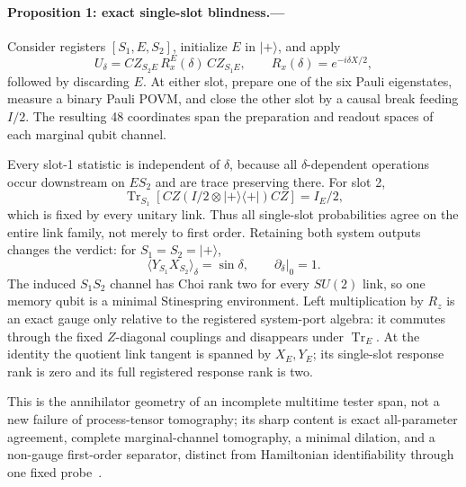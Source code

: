 \documentclass[aps,prl,reprint,superscriptaddress,nofootinbib]{revtex4-2}
\newcommand{\Tr}{\operatorname{Tr}}
\begin{document}
\paragraph{Proposition 1: exact single-slot blindness.---}
Consider registers $[S_1,E,S_2]$, initialize $E$ in $|+\rangle$, and apply
\begin{equation}
 U_\delta=CZ_{S_2E}\,R_x^E(\delta)\,CZ_{S_1E},
 \qquad R_x(\delta)=e^{-i\delta X/2},
 \label{eq:comb}
\end{equation}
followed by discarding $E$.  At either slot, prepare one of the six Pauli eigenstates, measure a binary Pauli POVM, and close the other slot by a causal break feeding $I/2$.  The resulting 48 coordinates span the preparation and readout spaces of each marginal qubit channel.

Every slot-1 statistic is independent of $\delta$, because all $\delta$-dependent operations occur downstream on $ES_2$ and are trace preserving there.  For slot 2,
\begin{equation}
 \Tr_{S_1}\!\left[CZ\left(I/2\otimes|+\rangle\!\langle+|\right)CZ\right]=I_E/2,
 \label{eq:pinning}
\end{equation}
which is fixed by every unitary link.  Thus all single-slot probabilities agree on the entire link family, not merely to first order.  Retaining both system outputs changes the verdict: for $S_1=S_2=|+\rangle$,
\begin{equation}
 \langle Y_{S_1}X_{S_2}\rangle_\delta=\sin\delta,
 \qquad \left.\partial_\delta\right|_0=1.
 \label{eq:separator}
\end{equation}
The induced $S_1S_2$ channel has Choi rank two for every $SU(2)$ link, so one memory qubit is a minimal Stinespring environment.  Left multiplication by $R_z$ is an exact gauge only relative to the registered system-port algebra: it commutes through the fixed $Z$-diagonal couplings and disappears under $\Tr_E$.  At the identity the quotient link tangent is spanned by $X_E,Y_E$; its single-slot response rank is zero and its full registered response rank is two.

This is the annihilator geometry of an incomplete multitime tester span, not a new failure of process-tensor tomography; its sharp content is exact all-parameter agreement, complete marginal-channel tomography, a minimal dilation, and a non-gauge first-order separator, distinct from Hamiltonian identifiability through one fixed probe~\cite{SoneCappellaro2017}.
\end{document}
